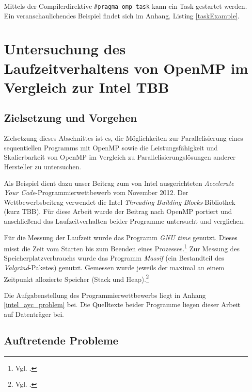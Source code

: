 \documentclass[11pt]{scrartcl}
\begin{document}
Mittels der Compilerdirektive \texttt{\#pragma omp task} kann ein Task gestartet werden. \\

Ein veranschaulichendes Beispiel findet sich im Anhang, Listing \ref{taskExample}. 

\pagebreak %

\section{Untersuchung des Laufzeitverhaltens von OpenMP im Vergleich zur Intel TBB}

\subsection{Zielsetzung und Vorgehen}

Zielsetzung dieses Abschnittes ist es, die Möglichkeiten zur Parallelisierung eines sequentiellen Programms mit OpenMP
sowie die Leistungsfähigkeit und Skalierbarkeit von OpenMP im Vergleich zu Parallelisierungslösungen anderer Hersteller
zu untersuchen.

Als Beispiel dient dazu unser Beitrag zum von Intel ausgerichteten \emph{Accelerate Your Code}-Programmierwettbewerb vom
November 2012. Der Wettbewerbsbeitrag verwendet die Intel \emph{Threading Building Blocks}-Bibliothek (kurz TBB). Für
diese Arbeit wurde der Beitrag nach OpenMP portiert und anschließend das Laufzeitverhalten beider Programme untersucht
und verglichen.

Für die Messung der Laufzeit wurde das Programm \emph{GNU time} genutzt. Dieses misst die Zeit vom Starten bis zum Beenden eines Prozesses.\footnote{Vgl. \cite{time_man_2012}.}
Zur Messung des Speicherplatzverbrauchs wurde das Programm \emph{Massif} (ein Bestandteil des \emph{Valgrind}-Paketes) genutzt. Gemessen wurde jeweils der maximal an einem Zeitpunkt allozierte Speicher (Stack und Heap).\footnote{Vgl. \cite[S. 136ff.]{valgrind_2012}.}

Die Aufgabenstellung des Programmierwettbewerbs liegt in Anhang \ref{intel_ayc_problem} bei. Die Quelltexte beider
Programme liegen dieser Arbeit auf Datenträger bei.

\subsection{Auftretende Probleme}
\end{document}
